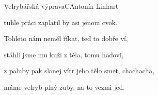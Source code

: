 \begin{song}{Velrybářská výprava}{C}{Antonín Linhart}
\begin{SBVerse}
tuhle práci zaplatil by asi jenom cvok.

\end{SBVerse}

\begin{SBVerse}

Tohleto nám neměl říkat, teď to dobře ví,

stáhli jsme mu kuži z těla, tomu hadovi,

z paluby pak slanej vítr jeho tělo smet, chachacha,

máme velryb plný zuby, na to vezmi jed.

\end{SBVerse}

\end{song}

\pagebreak
